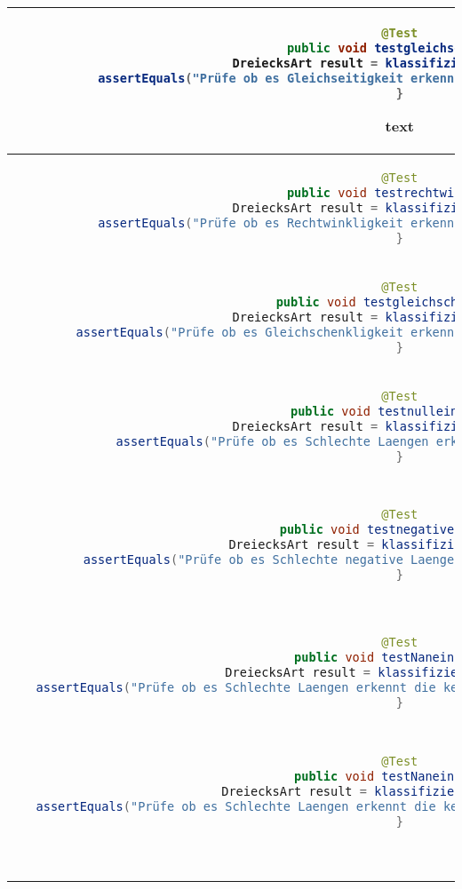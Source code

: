 \begin{parlist}
\begin{center}
\begin{tabular}{ | c | c | }
\begin{lstlisting}[language=java,frame=trBL]
@Test
public void testgleichseitig(){
   DreiecksArt result = klassifiziereDreieck(4,4,4);
   assertEquals("Prüfe ob es Gleichseitigkeit erkennt", DriecksArt.Gliechseitig, result);
}
  \end{lstlisting} text& Need to check if it can recognize equallateral triangles. \\ 
  \hline
  \begin{lstlisting}[language=java,frame=trBL]
@Test
public void testrechtwinklig(){
   DreiecksArt result = klassifiziereDreieck(3,4,5);
   assertEquals("Prüfe ob es Rechtwinkligkeit erkennt", DriecksArt.Rechtwinklig, result);
}
  \end{lstlisting} & Need to check if it can recognize right triangles. \\ 
  \hline
  \begin{lstlisting}[language=java,frame=trBL]
@Test
public void testgleichschenklig(){
   DreiecksArt result = klassifiziereDreieck(4,4,5);
   assertEquals("Prüfe ob es Gleichschenkligkeit erkennt", DriecksArt.Gleichschenklig, result);
}
  \end{lstlisting} &  Need to check if it can recognize isosceles triangles. \\ 
  \hline
  \begin{lstlisting}[language=java,frame=trBL]
@Test
public void testnulleingabe(){
   DreiecksArt result = klassifiziereDreieck(0,4,5);
   assertEquals("Prüfe ob es Schlechte Laengen erkennt", DriecksArt.Normal, result);
}
  \end{lstlisting} &  Need to check if it can recognize invalid lengths. \\ 
 \hline
  \begin{lstlisting}[language=java,frame=trBL]
@Test
public void testnegativeingabe(){
   DreiecksArt result = klassifiziereDreieck(3,-4,5);
   assertEquals("Prüfe ob es Schlechte negative Laengen erkennt", DriecksArt.Normal, result);
}
  \end{lstlisting} &  Need to check if it can recognize invalid lengths that are negative. \\ 
 \hline
\begin{lstlisting}[language=java,frame=trBL]
@Test
public void testNaneingabe(){
   DreiecksArt result = klassifiziereDreieck(3,4,NAN);
   assertEquals("Prüfe ob es Schlechte Laengen erkennt die keine Zahlen sind", DriecksArt.Normal, result);
}
  \end{lstlisting} &  Need to check if it can recognize lengths that are not Numbers. \\ 
 \hline
\begin{lstlisting}[language=java,frame=trBL]
@Test
public void testNaneingabe(){
   DreiecksArt result = klassifiziereDreieck(3,null,5);
   assertEquals("Prüfe ob es Schlechte Laengen erkennt die keine Werte haben", DriecksArt.Normal, result);
}
  \end{lstlisting} &  Need to check if it can recognize lengths that are null. \\ 
\hline
  \begin{lstlisting}[language=java,frame=trBL]


\end{lstlisting}
\end{tabular}
\end{center}
\end{parlist}
